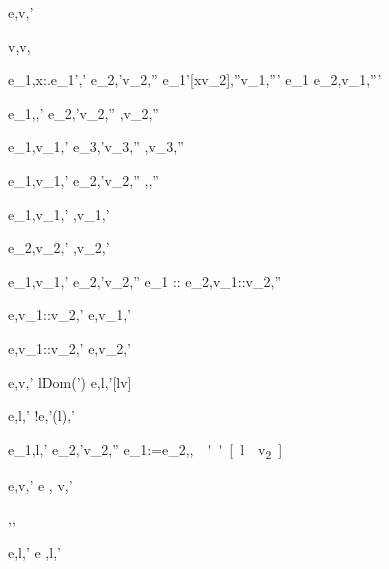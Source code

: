   {e,\sigma \eval v,\sigma'}


  {}
  {v,\sigma\eval v,\sigma}


  {e_1,\sigma\eval \lambda x:\tau.e_1',\sigma'\Quad
   e_2,\sigma'\eval v_2,\sigma''\Quad
   e_1'[x\mapsto v_2],\sigma''\eval v_1,\sigma'''}
  {e_1 e_2,\sigma \eval v_1,\sigma'''}


  {e_1,\sigma\eval \True,\sigma'\Quad
   e_2,\sigma'\eval v_2,\sigma''}
  {,\sigma\eval v_2,\sigma''}

  {e_1,\sigma\eval v_1,\sigma' \Quad
   e_3,\sigma'\eval v_3,\sigma''}
  {,\sigma\eval v_3,\sigma''}


  {e_1,\sigma\eval v_1,\sigma' \Quad
   e_2,\sigma'\eval v_2,\sigma''}
  {,\sigma\eval{},\sigma''}

  {e_1,\sigma\eval v_1,\sigma'}
  {\Fst{},\sigma\eval v_1,\sigma'}

  {e_2,\sigma\eval v_2,\sigma'}
  {\Snd{},\sigma\eval v_2,\sigma' }


  {e_1,\sigma\eval v_1,\sigma'\Quad
   e_2,\sigma'\eval v_2,\sigma''}
  {e_1 :: e_2,\sigma\eval v_1::v_2,\sigma''}

  {e,\sigma\eval v_1::v_2,\sigma'}
  {\Head e,\sigma\eval v_1,\sigma'}

{e,\sigma\eval v_1::v_2,\sigma'}
{\Tail e,\sigma\eval v_2,\sigma'}



  {e,\sigma\eval v,\sigma' \Quad
   l\not\in Dom(\sigma')}
  {\Share e,\sigma\eval l,\sigma'[l\mapsto v]}

  {e,\sigma\eval l,\sigma'}
  {!e,\sigma\eval \sigma'(l),\sigma'}

  {e_1,\sigma\eval l,\sigma' \Quad
   e_2,\sigma'\eval v_2,\sigma''}
  {e_1:=e_2,\sigma\eval \unit,\sigma''[l\mapsto v_2]}

  {e,\sigma \eval v,\sigma'}
  {\Update e , \sigma\eval \Update v,\sigma'}

  {}
  {\Enter \tau,\sigma \eval \Enter \tau,\sigma}

  {e,\sigma\eval l,\sigma'}
  {\Update e ,\sigma\eval \Update l,\sigma'}


